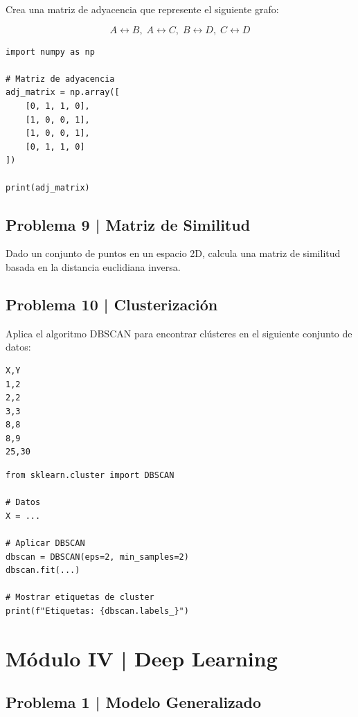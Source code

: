 \documentclass{article}
\begin{document}
Crea una matriz de adyacencia que represente el siguiente grafo:

\[
A \leftrightarrow B, \; A \leftrightarrow C, \; B \leftrightarrow D, \; C \leftrightarrow D
\]

\begin{lstlisting}[style=python]
import numpy as np

# Matriz de adyacencia
adj_matrix = np.array([
    [0, 1, 1, 0],
    [1, 0, 0, 1],
    [1, 0, 0, 1],
    [0, 1, 1, 0]
])

print(adj_matrix)
\end{lstlisting}

\clearpage

\subsection*{Problema 9 | Matriz de Similitud}

Dado un conjunto de puntos en un espacio 2D, calcula una matriz de similitud basada en la distancia euclidiana inversa.

\clearpage

\subsection*{Problema 10 | Clusterización}

Aplica el algoritmo DBSCAN para encontrar clústeres en el siguiente conjunto de datos:

\begin{verbatim}
X,Y
1,2
2,2
3,3
8,8
8,9
25,30
\end{verbatim}

\begin{lstlisting}[style=python]
from sklearn.cluster import DBSCAN

# Datos
X = ...

# Aplicar DBSCAN
dbscan = DBSCAN(eps=2, min_samples=2)
dbscan.fit(...)

# Mostrar etiquetas de cluster
print(f"Etiquetas: {dbscan.labels_}")
\end{lstlisting}

\clearpage

\section*{Módulo IV | Deep Learning}

\subsection*{Problema 1 | Modelo Generalizado}
\end{document}
